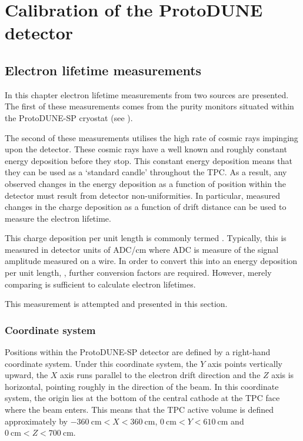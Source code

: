 \chapter{Calibration of the ProtoDUNE detector}
\label{sec:pdune_calibration}

\section{Electron lifetime measurements}
\label{sec:pdune_calibration:lifetime}

In this chapter electron lifetime measurements from two sources are presented.
The first of these measurements comes from the purity monitors situated within the ProtoDUNE-SP cryostat (see ).

The second of these measurements utilises the high rate of cosmic rays impinging upon the detector.
These cosmic rays have a well known and roughly constant energy deposition before they stop.
This constant energy deposition means that they can be used as a `standard candle' throughout the TPC.
As a result, any observed changes in the energy deposition as a function of position within the detector must result from detector non-uniformities.
In particular, measured changes in the charge deposition as a function of drift distance can be used to measure the electron lifetime.

This charge deposition per unit length is commonly termed \dqdx.
Typically, this \dqdx is measured in detector units of ADC/cm where ADC is measure of the signal amplitude measured on a wire.
In order to convert this into an energy deposition per unit length, \dedx, further conversion factors are required.
However, merely comparing \dqdx is sufficient to calculate electron lifetimes.

This measurement is attempted and presented in this section.

\subsection{Coordinate system}
\label{sec:pdune_calibration:lifetime:coords}

Positions within the ProtoDUNE-SP detector are defined by a right-hand coordinate system.
Under this coordinate system, the $Y$ axis points vertically upward, the $X$ axis runs parallel to the electron drift direction and the $Z$ axis is horizontal, pointing roughly in the direction of the beam.
In this coordinate system, the origin lies at the bottom of the central cathode at the TPC face where the beam enters.
This means that the TPC active volume is defined approximately by $\SI{-360}{\cm} < X < \SI{360}{\cm}$, $\SI{0}{\cm} < Y < \SI{610}{\cm}$ and $\SI{0}{\cm} < Z < \SI{700}{\cm}$.

